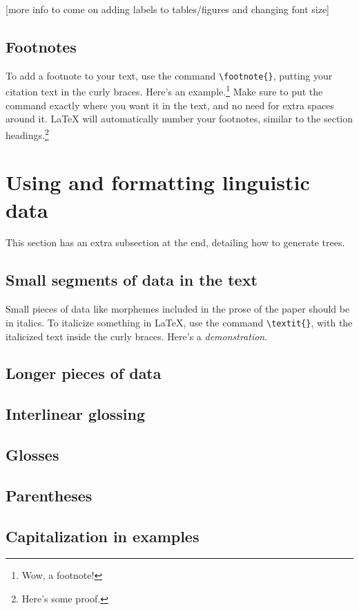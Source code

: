 \documentclass[12pt]{article}
\begin{document}
	[more info to come on adding labels to tables/figures and changing font size]
	
	\subsection{Footnotes}
	To add a footnote to your text, use the command \verb|\footnote{}|, putting your citation text in the curly braces. Here's an example.\footnote{Wow, a footnote!} Make sure to put the command exactly where you want it in the text, and no need for extra spaces around it. LaTeX will automatically number your footnotes, similar to the section headings.\footnote{Here's some proof.}
	
	\section{Using and formatting linguistic data}
	This section has an extra subsection at the end, detailing how to generate trees.
	
	\subsection{Small segments of data in the text}
	Small pieces of data like morphemes included in the prose of the paper should be in italics. To italicize something in LaTeX, use the command \verb|\textit{}|, with the italicized text inside the curly braces. Here's a \textit{demonstration}.
	
	\subsection{Longer pieces of data}
	
	\subsection{Interlinear glossing}
	
	\subsection{Glosses}
	
	\subsection{Parentheses}
	
	\subsection{Capitalization in examples}
	
\end{document}

